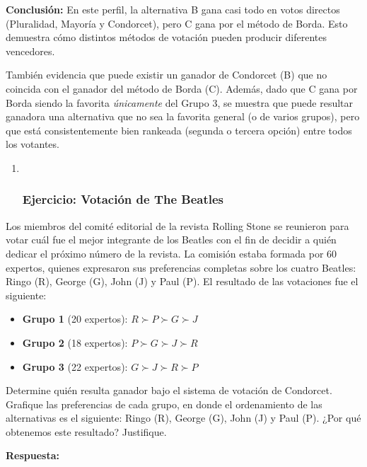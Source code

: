 \documentclass[
  letterpaper,
  DIV=11,
  numbers=noendperiod]{scrartcl}
\providecommand{\tightlist}{%
  \setlength{\itemsep}{0pt}\setlength{\parskip}{0pt}}
\begin{document}
\textbf{Conclusión:} En este perfil, la alternativa B gana casi todo en
votos directos (Pluralidad, Mayoría y Condorcet), pero C gana por el
método de Borda. Esto demuestra cómo distintos métodos de votación
pueden producir diferentes vencedores.

También evidencia que puede existir un ganador de Condorcet (B) que no
coincida con el ganador del método de Borda (C). Además, dado que C gana
por Borda siendo la favorita \emph{únicamente} del Grupo 3, se muestra
que puede resultar ganadora una alternativa que no sea la favorita
general (o de varios grupos), pero que está consistentemente bien
rankeada (segunda o tercera opción) entre todos los votantes.

\hfill\break

\begin{enumerate}
\def\labelenumi{\arabic{enumi})}
\setcounter{enumi}{4}
\item ~
  \subsubsection{Ejercicio: Votación de The
  Beatles}\label{ejercicio-votaciuxf3n-de-the-beatles}
\end{enumerate}

Los miembros del comité editorial de la revista Rolling Stone se
reunieron para votar cuál fue el mejor integrante de los Beatles con el
fin de decidir a quién dedicar el próximo número de la revista. La
comisión estaba formada por 60 expertos, quienes expresaron sus
preferencias completas sobre los cuatro Beatles: Ringo (R), George (G),
John (J) y Paul (P). El resultado de las votaciones fue el siguiente:

\begin{itemize}
\tightlist
\item
  \textbf{Grupo 1} (20 expertos): \(R \succ P \succ G \succ J\)
\item
  \textbf{Grupo 2} (18 expertos): \(P \succ G \succ J \succ R\)
\item
  \textbf{Grupo 3} (22 expertos): \(G \succ J \succ R \succ P\)
\end{itemize}

Determine quién resulta ganador bajo el sistema de votación de
Condorcet. Grafique las preferencias de cada grupo, en donde el
ordenamiento de las alternativas es el siguiente: Ringo (R), George (G),
John (J) y Paul (P). ¿Por qué obtenemos este resultado? Justifique.

\textbf{Respuesta:}
\end{document}
